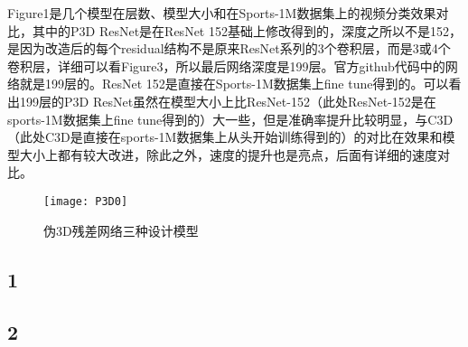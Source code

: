 Figure1是几个模型在层数、模型大小和在Sports-1M数据集上的视频分类效果对比，其中的P3D ResNet是在ResNet 152基础上修改得到的，深度之所以不是152，是因为改造后的每个residual结构不是原来ResNet系列的3个卷积层，而是3或4个卷积层，详细可以看Figure3，所以最后网络深度是199层。官方github代码中的网络就是199层的。ResNet 152是直接在Sports-1M数据集上fine tune得到的。可以看出199层的P3D ResNet虽然在模型大小上比ResNet-152（此处ResNet-152是在sports-1M数据集上fine tune得到的）大一些，但是准确率提升比较明显，与C3D（此处C3D是直接在sports-1M数据集上从头开始训练得到的）的对比在效果和模型大小上都有较大改进，除此之外，速度的提升也是亮点，后面有详细的速度对比。

\begin{figure}[]
\centering
\texttt{[image: P3D0]}
\caption{伪3D残差网络三种设计模型}
\label{fig18}
\end{figure}

\subsection{1}

%
%

\subsection{2}

%

